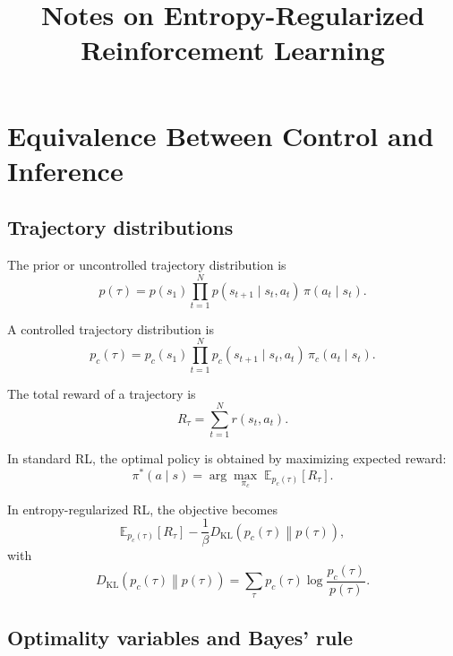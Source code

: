 \documentclass[11pt]{article}
\title{Notes on Entropy-Regularized Reinforcement Learning}
\author{}
\date{}
\begin{document}
\maketitle
\tableofcontents

\section{Equivalence Between Control and Inference}

\subsection*{Trajectory distributions}

The prior or uncontrolled trajectory distribution is
\begin{equation}
    p(\tau) = p(s_1)\prod_{t=1}^{N} p(s_{t+1}\mid s_t,a_t)\,\pi(a_t\mid s_t).
\end{equation}

A controlled trajectory distribution is
\begin{equation}
    p_c(\tau) = p_c(s_1)\prod_{t=1}^{N} p_c(s_{t+1}\mid s_t,a_t)\,\pi_c(a_t\mid s_t).
\end{equation}

The total reward of a trajectory is
\begin{equation}
    R_\tau = \sum_{t=1}^{N} r(s_t,a_t).
\end{equation}

In standard RL, the optimal policy is obtained by maximizing expected reward:
\begin{equation}
    \pi^*(a\mid s) = \arg\max_{\pi_c}\; \mathbb{E}_{p_c(\tau)}[R_\tau].
\end{equation}

In entropy-regularized RL, the objective becomes
\begin{equation}
    \mathbb{E}_{p_c(\tau)}[R_\tau] - \frac{1}{\beta}
    D_{\mathrm{KL}}\!\left(p_c(\tau)\middle\|p(\tau)\right),
\end{equation}
with
\begin{equation}
    D_{\mathrm{KL}}\!\left(p_c(\tau)\middle\|p(\tau)\right)
    = \sum_{\tau} p_c(\tau)\log\frac{p_c(\tau)}{p(\tau)}.
\end{equation}

\subsection*{Optimality variables and Bayes' rule}
\end{document}
